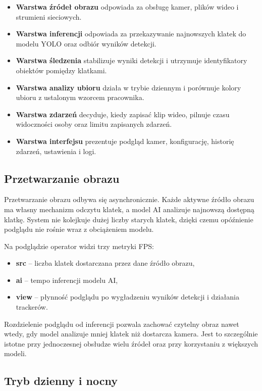 \begin{itemize}
\item \textbf{Warstwa źródeł obrazu} odpowiada za obsługę kamer, plików wideo i strumieni sieciowych.
\item \textbf{Warstwa inferencji} odpowiada za przekazywanie najnowszych klatek do modelu YOLO oraz odbiór wyników detekcji.
\item \textbf{Warstwa śledzenia} stabilizuje wyniki detekcji i utrzymuje identyfikatory obiektów pomiędzy klatkami.
\item \textbf{Warstwa analizy ubioru} działa w trybie dziennym i porównuje kolory ubioru z ustalonym wzorcem pracownika.
\item \textbf{Warstwa zdarzeń} decyduje, kiedy zapisać klip wideo, pilnuje czasu widoczności osoby oraz limitu zapisanych zdarzeń.
\item \textbf{Warstwa interfejsu} prezentuje podgląd kamer, konfigurację, historię zdarzeń, ustawienia i logi.
\end{itemize}

\subsection{Przetwarzanie obrazu}

Przetwarzanie obrazu odbywa się asynchronicznie. Każde aktywne źródło obrazu ma własny mechanizm odczytu klatek, a model AI analizuje najnowszą dostępną klatkę. System nie kolejkuje dużej liczby starych klatek, dzięki czemu opóźnienie podglądu nie rośnie wraz z obciążeniem modelu.

Na podglądzie operator widzi trzy metryki FPS:

\begin{itemize}
\item \textbf{src} -- liczba klatek dostarczana przez dane źródło obrazu,
\item \textbf{ai} -- tempo inferencji modelu AI,
\item \textbf{view} -- płynność podglądu po wygładzeniu wyników detekcji i działania trackerów.
\end{itemize}

Rozdzielenie podglądu od inferencji pozwala zachować czytelny obraz nawet wtedy, gdy model analizuje mniej klatek niż dostarcza kamera. Jest to szczególnie istotne przy jednoczesnej obsłudze wielu źródeł oraz przy korzystaniu z większych modeli.

\subsection{Tryb dzienny i nocny}

